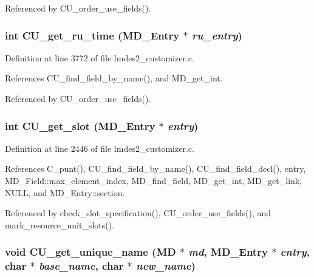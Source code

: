 Referenced by CU\_\-order\_\-use\_\-fields().
\subsubsection{\setlength{\rightskip}{0pt plus 5cm}int CU\_\-get\_\-ru\_\-time (\bf{MD\_\-Entry} $\ast$ {\em ru\_\-entry})}\label{lmdes2__customizer_8c_9c7268b691bd7ad874ab904435b25527}




Definition at line 3772 of file lmdes2\_\-customizer.c.

References CU\_\-find\_\-field\_\-by\_\-name(), and MD\_\-get\_\-int.

Referenced by CU\_\-order\_\-use\_\-fields().
\subsubsection{\setlength{\rightskip}{0pt plus 5cm}int CU\_\-get\_\-slot (\bf{MD\_\-Entry} $\ast$ {\em entry})}\label{lmdes2__customizer_8c_68cc9dad453a2e899020a7ee00ae52bb}




Definition at line 2446 of file lmdes2\_\-customizer.c.

References C\_\-punt(), CU\_\-find\_\-field\_\-by\_\-name(), CU\_\-find\_\-field\_\-decl(), entry, MD\_\-Field::max\_\-element\_\-index, MD\_\-find\_\-field, MD\_\-get\_\-int, MD\_\-get\_\-link, NULL, and MD\_\-Entry::section.

Referenced by check\_\-slot\_\-specification(), CU\_\-order\_\-use\_\-fields(), and mark\_\-resource\_\-unit\_\-slots().
\subsubsection{\setlength{\rightskip}{0pt plus 5cm}void CU\_\-get\_\-unique\_\-name (\bf{MD} $\ast$ {\em md}, \bf{MD\_\-Entry} $\ast$ {\em entry}, char $\ast$ {\em base\_\-name}, char $\ast$ {\em new\_\-name})}\label{lmdes2__customizer_8c_0d6d799591481b18affc74f76c135c41}




